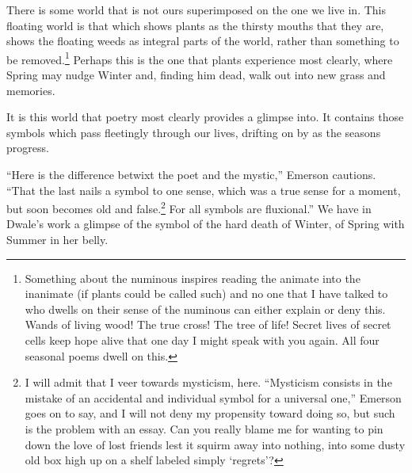 There is some world that is not ours superimposed on the one we live in. This floating world is that which shows plants as the thirsty mouths that they are, shows the floating weeds as integral parts of the world, rather than something to be removed.\footnote{Something about the numinous inspires reading the animate into the inanimate (if plants could be called such) and no one that I have talked to who dwells on their sense of the numinous can either explain or deny this. Wands of living wood! The true cross! The tree of life! Secret lives of secret cells keep hope alive that one day I might speak with you again. All four seasonal poems dwell on this.} Perhaps this is the one that plants experience most clearly, where Spring may nudge Winter and, finding him dead, walk out into new grass and memories.

It is this world that poetry most clearly provides a glimpse into. It contains those symbols which pass fleetingly through our lives, drifting on by as the seasons progress.

``Here is the difference betwixt the poet and the mystic,'' Emerson cautions. ``That the last nails a symbol to one sense, which was a true sense for a moment, but soon becomes old and false.\footnote{I will admit that I veer towards mysticism, here. ``Mysticism consists in the mistake of an accidental and individual symbol for a universal one,'' Emerson goes on to say, and I will not deny my propensity toward doing so, but such is the problem with an essay. Can you really blame me for wanting to pin down the love of lost friends lest it squirm away into nothing, into some dusty old box high up on a shelf labeled simply `regrets'?} For all symbols are fluxional.'' \parencite[33]{emerson} We have in Dwale's work a glimpse of the symbol of the hard death of Winter, of Spring with Summer in her belly.
